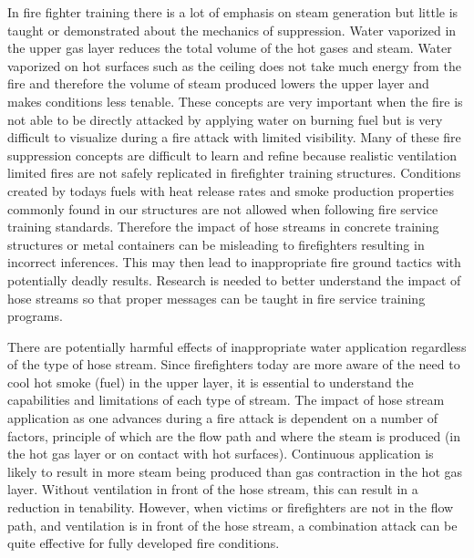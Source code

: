 \documentclass{article}
\begin{document}
In fire fighter training there is a lot of emphasis on steam generation but little is taught or demonstrated about the mechanics of suppression. Water vaporized in the upper gas layer reduces the total volume of the hot gases and steam. Water vaporized on hot surfaces such as the ceiling does not take much energy from the fire and therefore the volume of steam produced lowers the upper layer and makes conditions less tenable. These concepts are very important when the fire is not able to be directly attacked by applying water on burning fuel but is very difficult to visualize during a fire attack with limited visibility. Many of these fire suppression concepts are difficult to learn and refine because realistic ventilation limited fires are not safely replicated in firefighter training structures. Conditions created by todays fuels with heat release rates and smoke production properties commonly found in our structures are not allowed when following fire service training standards. Therefore the impact of hose streams in concrete training structures or metal containers can be misleading to firefighters resulting in incorrect inferences. This may then lead to inappropriate fire ground tactics with potentially deadly results. Research is needed to better understand the impact of hose streams so that proper messages can be taught in fire service training programs.

There are potentially harmful effects of inappropriate water application regardless of the type of hose stream. Since firefighters today are more aware of the need to cool hot smoke (fuel) in the upper layer, it is essential to understand the capabilities and limitations of each type of stream. The impact of hose stream application as one advances during a fire attack is dependent on a number of factors, principle of which are the flow path and where the steam is produced (in the hot gas layer or on contact with hot surfaces). Continuous application is likely to result in more steam being produced than gas contraction in the hot gas layer. Without ventilation in front of the hose stream, this can result in a reduction in tenability. However, when victims or firefighters are not in the flow path, and ventilation is in front of the hose stream, a combination attack can be quite effective for fully developed fire conditions.
\end{document}
